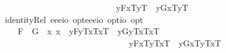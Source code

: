 \begin{isabellebody}
\ \ \ \ \ \ \ \ \ \ \ \ \ \ \ \ \ \ \ \ \ \ \ \ \ \ \isactrlbold {\isasymand}\ {\isacharparenleft}\isactrlbold {\isasymlambda}y{\isachardot}{\isasymlparr}F{}{\isacharcomma}x{}\isactrlsup T{\isacharcomma}y\isactrlsup T{\isasymrparr}{\isacharparenright}\ \isactrlbold {\isacharequal}\ {\isacharparenleft}\isactrlbold {\isasymlambda}y{\isachardot}{\isasymlparr}G{}{\isacharcomma}x{}\isactrlsup T{\isacharcomma}y\isactrlsup T{\isasymrparr}{\isacharparenright}{\isacharparenright}{\isachardoublequoteclose}\isanewline
\isanewline
\ \isamarkupfalse%
\ identityRel{}{\isacharcolon}{\isacharcolon}{\isachardoublequoteopen}\ {\isacharparenleft}{\isacharparenleft}e{\isasymRightarrow}e{\isasymRightarrow}e{\isasymRightarrow}io{\isacharparenright}\ opt{\isacharparenright}{\isasymRightarrow}{\isacharparenleft}{\isacharparenleft}e{\isasymRightarrow}e{\isasymRightarrow}e{\isasymRightarrow}io{\isacharparenright}\ opt{\isacharparenright}{\isasymRightarrow}io\ opt{\isachardoublequoteclose}\ {\isacharparenleft}\ {\isachardoublequoteopen}\isactrlbold {\isacharequal}\ {}{}{\isacharparenright}\ \isanewline
\ \ \ \ {\isachardoublequoteopen}F{}\ \isactrlbold {\isacharequal}\ G{}\ {\isasymequiv}\ \isactrlbold {\isasymforall}x{}\ x{}{\isachardot}{\isacharparenleft}\ \ {\isacharparenleft}\isactrlbold {\isasymlambda}y{\isachardot}{\isasymlparr}F{}{\isacharcomma}y\isactrlsup T{\isacharcomma}x{}\isactrlsup T{\isacharcomma}x{}\isactrlsup T{\isasymrparr}{\isacharparenright}\ \isactrlbold {\isacharequal}\ {\isacharparenleft}\isactrlbold {\isasymlambda}y{\isachardot}{\isasymlparr}G{}{\isacharcomma}y\isactrlsup T{\isacharcomma}x{}\isactrlsup T{\isacharcomma}x{}\isactrlsup T{\isasymrparr}{\isacharparenright}\isanewline
\ \ \ \ \ \ \ \ \ \ \ \ \ \ \ \ \ \ \ \ \ \ \ \ \ \ \ \ \ \isactrlbold {\isasymand}\ {\isacharparenleft}\isactrlbold {\isasymlambda}y{\isachardot}{\isasymlparr}F{}{\isacharcomma}x{}\isactrlsup T{\isacharcomma}y\isactrlsup T{\isacharcomma}x{}\isactrlsup T{\isasymrparr}{\isacharparenright}\ \isactrlbold {\isacharequal}\ {\isacharparenleft}\isactrlbold {\isasymlambda}y{\isachardot}{\isasymlparr}G{}{\isacharcomma}x{}\isactrlsup T{\isacharcomma}y\isactrlsup T{\isacharcomma}x{}\isactrlsup T{\isasymrparr}{\isacharparenright}\isanewline

\end{isabellebody}
